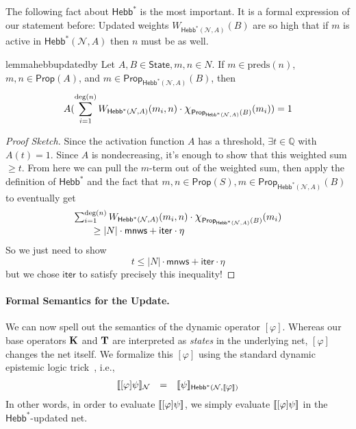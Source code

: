 \documentclass[letterpaper]{article}
\theoremstyle{definition}
\newenvironment{sketch}{\begin{proof}[Proof Sketch]}{\end{proof}}
\newcommand{\Rat}{\mathbb{Q}}
\newcommand{\State}{\mathsf{State}}
\newcommand{\semantics}[1]{[\![\mbox{\em $ #1 $\/}]\!]}
\newcommand*{\bigchi}{\mbox{\Large$\chi$}}%
\newcommand{\degree}[1]{\mathrm{deg}(#1)}
\newcommand{\preds}[1]{\mbox{preds}(#1)}
\newcommand{\minscore}{\mathsf{mnws}}
\newcommand{\numiterations}{\mathsf{iter}}
\newcommand{\Net}{\mathcal{N}}
\newcommand{\Prop}{\mathsf{Prop}}
\newcommand{\Hebbstar}[2]{\mathsf{Hebb}^*(#1, #2)}
\newcommand{\HebbstarNoArgs}{\mathsf{Hebb}^*}
\newcommand{\KnowNoArgs}{\textrm{\textup{\textbf{K}}}}
\newcommand{\TypNoArgs}{\textrm{\textup{\textbf{T}}}}
\newcommand{\Hebbop}[1]{[#1]}
\begin{document}
The following fact about $\HebbstarNoArgs$ is the most important.  It is a formal expression of our statement before:  Updated weights $W_{\Hebbstar{\Net}{A}}(B)$ are so high that if $m$ is active in $\Hebbstar{\Net}{A}$ then $n$ must be as well.
\begin{restatable}{lemma}{hebbupdatedby}
    \label{hebb_updated_by}
    Let $A, B \in \State, m, n \in N$. If $m \in \preds{n}$, $m, n \in \Prop(A)$, and $m \in \Prop_{\Hebbstar{\Net}{A}}(B)$, then
    \[
        A(\sum_{i=1}^{\degree{n}} W_{\Hebbstar{\Net}{A}}(m_i, n) \cdot \bigchi_{\Prop_{\Hebbstar{\Net}{A}}(B)}(m_i)) = 1
    \]
\end{restatable}
\begin{sketch}
    Since the activation function $A$ has a threshold, $\exists t \in \Rat$ with $A(t) = 1$. Since $A$ is nondecreasing, it's enough to show that this weighted sum $\geq t$.  From here we can pull the $m$-term out of the weighted sum, then apply the definition of $\HebbstarNoArgs$ and the fact that $m, n \in \Prop(S), m \in \Prop_{\Hebbstar{\Net}{A}}(B)$ to eventually get
    \[
    \begin{array}{l}
        \sum_{i=1}^{\degree{n}} W_{\Hebbstar{\Net}{A}}(m_i, n) \cdot \bigchi_{\Prop_{\Hebbstar{\Net}{A}}(B)}(m_i)\\
        
        \quad \quad \geq
        |N| \cdot \minscore + \numiterations \cdot \eta \\
    \end{array}
    \]
    So we just need to show
    \[
        t \leq |N| \cdot \minscore + \numiterations \cdot \eta
    \]
    but we chose $\numiterations$ to satisfy precisely this inequality!
\end{sketch}

\paragraph*{Formal Semantics for the Update.} We can now spell out the semantics of the dynamic operator $\Hebbop{\varphi}$.  Whereas our base operators $\KnowNoArgs$ and $\TypNoArgs$ are interpreted as \emph{states} in the underlying net, $\Hebbop{\varphi}$ changes the net itself.  We formalize this $\Hebbop{\varphi}$ using the standard dynamic epistemic logic trick~\cite{DELBook}, i.e.,
\[
\begin{array}{lcl}
    \semantics{\Hebbop{\varphi} \psi}_\Net & = & \semantics{\psi}_{\Hebbstar{\Net}{\semantics{\varphi}}}
\end{array}
\]
In other words, in order to evaluate $\semantics{\Hebbop{\varphi} \psi}$, we simply evaluate $\semantics{\Hebbop{\varphi} \psi}$ in the $\HebbstarNoArgs$-updated net.
\end{document}
